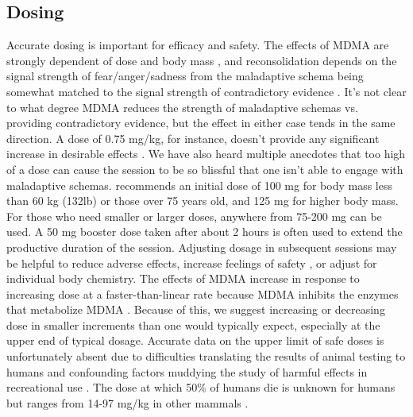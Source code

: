 \documentclass[12pt,letterpaper]{book}
\begin{document}
\subsection*{Dosing}
\label{sec:dosing}
Accurate dosing is important for efficacy and safety. The effects of MDMA are strongly dependent of dose and body mass \cite{studerusResponse}, and reconsolidation depends on the signal strength of fear/anger/sadness from the maladaptive schema being somewhat matched to the signal strength of contradictory evidence \cite{eckerUnlocking}. It's not clear to what degree MDMA reduces the strength of maladaptive schemas vs. providing contradictory evidence, but the effect in either case tends in the same direction. A dose of 0.75 mg/kg, for instance, doesn't provide any significant increase in desirable effects \cite{bediMDMALowDose}. We have also heard multiple anecdotes that too high of a dose can cause the session to be so blissful that one isn't able to engage with maladaptive schemas. \textcite{liechtiInteractions} recommends an initial dose of 100 mg for body mass less than 60 kg (132lb) or those over 75 years old, and 125 mg for higher body mass. For those who need smaller or larger doses, anywhere from 75-200 mg can be used. A 50 mg booster dose taken after about 2 hours is often used to extend the productive duration of the session. Adjusting dosage in subsequent sessions may be helpful to reduce adverse effects, increase feelings of safety \cite{regan2021Connection}, or adjust for individual body chemistry. The effects of MDMA increase in response to increasing dose at a faster-than-linear rate because MDMA inhibits the enzymes that metabolize MDMA \cite{de2000nonlinear}. Because of this, we suggest increasing or decreasing dose in smaller increments than one would typically expect, especially at the upper end of typical dosage. Accurate data on the upper limit of safe doses is unfortunately absent due to difficulties translating the results of animal testing to humans and confounding factors muddying the study of harmful effects in recreational use \cite{passieHistory}. The dose at which 50\% of humans die is unknown for humans but ranges from 14-97 mg/kg in other mammals \cite{pharmalaInvestigatorBrochure}.
\end{document}
